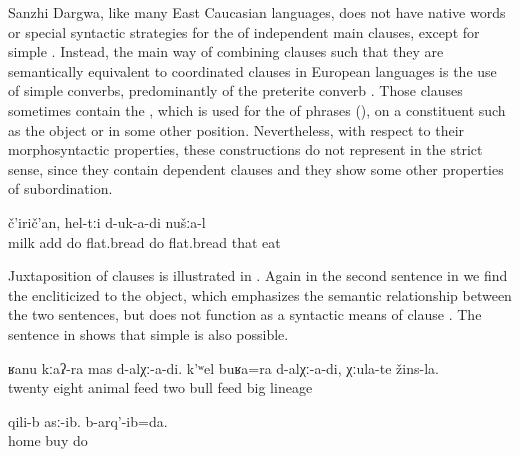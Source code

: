 Sanzhi Dargwa, like many East Caucasian languages, does not have native words or special syntactic strategies for the  of independent main clauses, except for simple . Instead, the main way of combining clauses such that they are semantically equivalent to coordinated clauses in European languages is the use of simple converbs, predominantly of the preterite converb . Those clauses sometimes contain the  , which is used for the  of phrases (), on a constituent such as the object or in some other position. Nevertheless, with respect to their morphosyntactic properties, these constructions do not represent  in the strict sense, since they contain dependent clauses and they show some other properties of subordination.

\begin{exe}
	\ex	\label{ex:‎We added milk, prepared flat breads and ate them}
		č'irič'an,	hel-tːi	d-uk-a-di	nušːa-l\\
		milk add	do	flat.bread	do	flat.bread	that	eat	\\
	\glt	{}
\end{exe}

Juxtaposition of clauses is illustrated in . Again in the second sentence in  we find the   encliticized to the object, which emphasizes the semantic relationship between the two sentences, but does not function as a syntactic means of clause . The sentence in  shows that simple  is also possible.

\begin{exe}
	\ex	\label{ex:We fed 28 animals, and we also fed two good (lit. big) breeding bulls.}
	\gll	ʁanu	kːaʔ-ra	mas	d-alχː-a-di.	k'ʷel	buʁa=ra d-alχː-a-di,	χːula-te	žins-la.\\
		twenty	eight	animal	feed two	bull	feed	big 	lineage\\
	\glt	{}

	\ex	\label{ex:‎They bought (the medicine) at home and I did (the cure)}
	\gll	qili-b	asː-ib.	b-arq'-ib=da.\\
		home	buy	do\\
	\glt	{} %
\end{exe}

